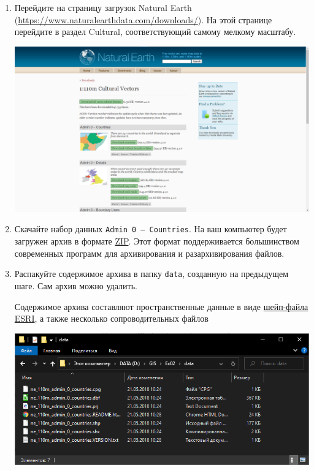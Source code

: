 \documentclass[
  12pt,
]{book}
\begin{document}
\begin{enumerate}
\def\labelenumi{\arabic{enumi}.}
\item
  Перейдите на страницу загрузок Natural Earth (\url{https://www.naturalearthdata.com/downloads/}). На этой странице перейдите в раздел Cultural, соответствующий самому мелкому масштабу.

  \includegraphics{images/Ex01_WorldMap/NaturalEarthDownloadPage.png}
\item
  Скачайте набор данных \texttt{Admin\ 0\ –\ Countries}. На ваш компьютер будет загружен архив в формате \href{https://pkware.cachefly.net/webdocs/casestudies/APPNOTE.TXT}{ZIP}. Этот формат поддерживается большинством современных программ для архивирования и разархивирования файлов.
\item
  Распакуйте содержимое архива в папку \texttt{data}, созданную на предыдущем шаге. Сам архив можно удалить.

  Содержимое архива составляют пространственные данные в виде \protect\hyperlink{manual-dataformats-shapefile}{шейп-файла ESRI}, а также несколько сопроводительных файлов

  \includegraphics{images/Ex01_WorldMap/Shapefile.png}


\end{enumerate}
\end{document}
